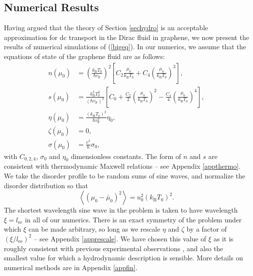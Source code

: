 \documentclass[10pt, oneside]{book}
\begin{document}
\begin{doublespace}
\section{Numerical Results}\label{secnum}
Having argued that the theory of Section \ref{sechydro} is an acceptable approximation for dc transport in the Dirac fluid in graphene, we now present the results of numerical simulations of (\ref{bigeq}).   In our numerics, we assume that the equations of state of the graphene fluid are as follows: \begin{subequations}\label{numericmain}\begin{align}
n(\mu_0) &= \left(\frac{k_{\mathrm{B}}T_0}{\hbar v_{\mathrm{F}}}\right)^2\left[C_2 \frac{\mu_0}{k_{\mathrm{B}}T_0} + C_4 \left(\frac{\mu_0}{k_{\mathrm{B}}T_0}\right)^3\right], \\
s(\mu_0) &= \frac{k_{\mathrm{B}}^3T_0^2}{(\hbar v_{\mathrm{F}})^2}\left[C_0 + \frac{C_2}{2} \left(\frac{\mu_0}{k_{\mathrm{B}}T_0}\right)^2 -\frac{C_4}{4} \left(\frac{\mu_0}{k_{\mathrm{B}}T_0}\right)^4\right], \\
\eta(\mu_0) &= \frac{(k_{\mathrm{B}}T_0)^2}{\hbar v_{\mathrm{F}}^2} \eta_0, \\
\zeta(\mu_0) &= 0, \\
\sigma(\mu_0) &= \frac{e^2}{\hbar}\sigma_0,
\end{align}\end{subequations}
with $C_{0,2,4}$, $\sigma_0$ and $\eta_0$ dimensionless constants.   The form of $n$ and $s$ are consistent with thermodynamic Maxwell relations -- see Appendix \ref{appthermo}.   We take the disorder profile to be random sums of sine waves, and normalize the disorder distribution so that \begin{equation}
\left\langle (\mu_0 - \bar\mu_0)^2\right\rangle = u_0^2 (k_{\mathrm{B}}T_0)^2.  \label{numericmain2}
\end{equation}
The shortest wavelength sine wave in the problem is taken to have wavelength $\xi=l_{\mathrm{ee}}$ in all of our numerics.   There is an exact symmetry of the problem under which $\xi$ can be made arbitrary, so long as we rescale $\eta$ and $\zeta$ by a factor of $(\xi/l_{\mathrm{ee}})^2$ -- see Appendix \ref{apprescale}.   We have chosen this value of $\xi$ as it is roughly consistent with previous experimental observations \cite{xue}, and also the smallest value for which a hydrodynamic description is sensible.    More details on numerical methods are in Appendix \ref{appfin}.





\end{doublespace}
\end{document}
